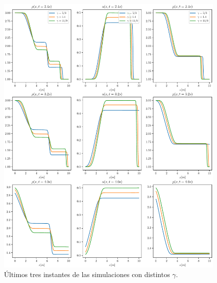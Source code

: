 \begin{figure}[H]
	\includegraphics[width=\linewidth]{../euler1D/experimentos/graficas_sod/2.pdf}
	\caption{Últimos tres instantes de las simulaciones con distintos $\gamma$.}
	\label{fig:sod-gammas-2}
\end{figure}

